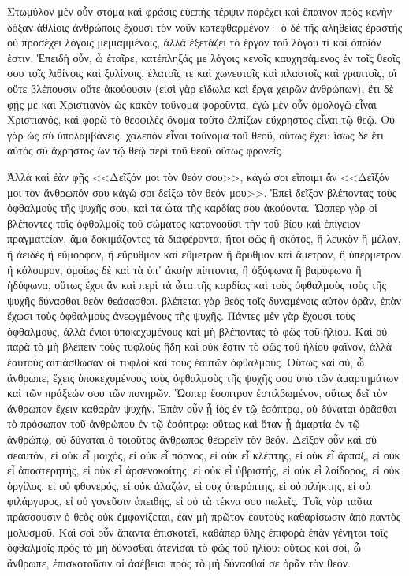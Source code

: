

Στωμύλον μὲν οὖν στόμα καὶ φράσις εὐεπὴς τέρψιν παρέχει καὶ ἔπαινον πρὸς κενὴν δόξαν ἀθλίοις ἀνθρώποις ἔχουσι τὸν νοῦν κατεφθαρμένον· ὁ δὲ τῆς ἀληθείας ἐραστὴς οὐ προσέχει λόγοις μεμιαμμένοις, ἀλλὰ ἐξετάζει τὸ ἔργον τοῦ λόγου τί καὶ ὁποῖόν ἐστιν. Ἐπειδὴ οὖν, ὦ ἑταῖρε, κατέπληξάς με λόγοις κενοῖς καυχησάμενος ἐν τοῖς θεοῖς σου τοῖς λιθίνοις καὶ ξυλίνοις, ἐλατοῖς τε καὶ χωνευτοῖς καὶ πλαστοῖς καὶ γραπτοῖς, οἳ οὔτε βλέπουσιν οὔτε ἀκούουσιν (εἰσὶ γὰρ εἴδωλα καὶ ἔργα χειρῶν ἀνθρώπων), ἔτι δὲ φῄς με καὶ Χριστιανὸν ὡς κακὸν τοὔνομα φοροῦντα, ἐγὼ μὲν οὖν ὁμολογῶ εἶναι Χριστιανός, καὶ φορῶ τὸ θεοφιλὲς ὄνομα τοῦτο ἐλπίζων εὔχρηστος εἶναι τῷ θεῷ. Οὐ γὰρ ὡς σὺ ὑπολαμβάνεις, χαλεπὸν εἶναι τοὔνομα τοῦ θεοῦ, οὕτως ἔχει: ἴσως δὲ ἔτι αὐτὸς σὺ ἄχρηστος ὢν τῷ θεῷ περὶ τοῦ θεοῦ οὕτως φρονεῖς.

Ἀλλὰ καὶ ἐὰν φῇς <<Δεῖξόν μοι τὸν θεόν σου>>, κἀγώ σοι εἴποιμι ἄν <<Δεῖξόν μοι τὸν ἄνθρωπόν σου κἀγώ σοι δείξω τὸν θεόν μου>>. Ἐπεὶ δεῖξον βλέποντας τοὺς ὀφθαλμοὺς τῆς ψυχῆς σου, καὶ τὰ ὦτα τῆς καρδίας σου ἀκούοντα. Ὥσπερ γὰρ οἱ βλέποντες τοῖς ὀφθαλμοῖς τοῦ σώματος κατανοοῦσι τὴν τοῦ βίου καὶ ἐπίγειον πραγματείαν, ἅμα δοκιμάζοντες τὰ διαφέροντα, ἤτοι φῶς ἢ σκότος, ἢ λευκὸν ἢ μέλαν, ἢ ἀειδὲς ἢ εὔμορφον, ἢ εὔρυθμον καὶ εὔμετρον ἢ ἄρυθμον καὶ ἄμετρον, ἢ ὑπέρμετρον ἢ κόλουρον, ὁμοίως δὲ καὶ τὰ ὑπ᾽ ἀκοὴν πίπτοντα, ἢ ὀξύφωνα ἢ βαρύφωνα ἢ ἡδύφωνα, οὕτως ἔχοι ἂν καὶ περὶ τὰ ὦτα τῆς καρδίας καὶ τοὺς ὀφθαλμοὺς τοὺς τῆς ψυχῆς δύνασθαι θεὸν θεάσασθαι. βλέπεται γὰρ θεὸς τοῖς δυναμένοις αὐτὸν ὁρᾶν, ἐπὰν ἔχωσι τοὺς ὀφθαλμοὺς ἀνεῳγμένους τῆς ψυχῆς. Πάντες μὲν γὰρ ἔχουσι τοὺς ὀφθαλμούς, ἀλλὰ ἔνιοι ὑποκεχυμένους καὶ μὴ βλέποντας τὸ φῶς τοῦ ἡλίου. Καὶ οὐ παρὰ τὸ μὴ βλέπειν τοὺς τυφλοὺς ἤδη καὶ οὐκ ἔστιν τὸ φῶς τοῦ ἡλίου φαῖνον, ἀλλὰ ἑαυτοὺς αἰτιάσθωσαν οἱ τυφλοὶ καὶ τοὺς ἑαυτῶν ὀφθαλμούς. Οὕτως καὶ σύ, ὦ ἄνθρωπε, ἔχεις ὑποκεχυμένους τοὺς ὀφθαλμοὺς τῆς ψυχῆς σου ὑπὸ τῶν ἁμαρτημάτων καὶ τῶν πράξεών σου τῶν πονηρῶν. Ὥσπερ ἔσοπτρον ἐστιλβωμένον, οὕτως δεῖ τὸν ἄνθρωπον ἔχειν καθαρὰν ψυχήν. Ἐπὰν οὖν ᾖ ἰὸς ἐν τῷ ἐσόπτρῳ, οὐ δύναται ὁρᾶσθαι τὸ πρόσωπον τοῦ ἀνθρώπου ἐν τῷ ἐσόπτρῳ:  οὕτως καὶ ὅταν ᾖ ἁμαρτία ἐν τῷ ἀνθρώπῳ, οὐ δύναται ὁ τοιοῦτος ἄνθρωπος θεωρεῖν τὸν θεόν. Δεῖξον οὖν καὶ σὺ σεαυτόν, εἰ οὐκ εἶ μοιχός, εἰ οὐκ εἶ πόρνος, εἰ οὐκ εἶ κλέπτης, εἰ οὐκ εἶ ἅρπαξ, εἰ οὐκ εἶ ἀποστερητής, εἰ οὐκ εἶ ἀρσενοκοίτης, εἰ οὐκ εἶ ὑβριστής, εἰ οὐκ εἶ λοίδορος, εἰ οὐκ ὀργίλος, εἰ οὐ φθονερός, εἰ οὐκ ἀλαζών, εἰ οὐχ ὑπερόπτης, εἰ οὐ πλήκτης, εἰ οὐ φιλάργυρος, εἰ οὐ γονεῦσιν ἀπειθής, εἰ οὐ τὰ τέκνα σου πωλεῖς. Τοῖς γὰρ ταῦτα πράσσουσιν ὁ θεὸς οὐκ ἐμφανίζεται, ἐὰν μὴ πρῶτον ἑαυτοὺς καθαρίσωσιν ἀπὸ παντὸς μολυσμοῦ. Καὶ σοὶ οὖν ἅπαντα ἐπισκοτεῖ, καθάπερ ὕλης ἐπιφορὰ ἐπὰν γένηται τοῖς ὀφθαλμοῖς πρὸς τὸ μὴ δύνασθαι ἀτενίσαι τὸ φῶς τοῦ ἡλίου: οὕτως καὶ σοί, ὦ ἄνθρωπε, ἐπισκοτοῦσιν αἱ ἀσέβειαι πρὸς τὸ μὴ δύνασθαί σε ὁρᾶν τὸν θεόν.